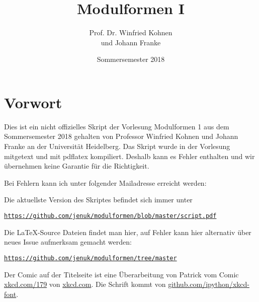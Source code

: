 \documentclass[parskip=half]{scrbook}
\title{Modulformen I}
\author{Prof. Dr. Winfried Kohnen \\[0.2\baselineskip] und Johann Franke}
\date{Sommersemester 2018}
\begin{document}
\pagestyle{plain}

\maketitle

\chapter*{Vorwort}

Dies ist ein nicht offizielles Skript der Vorlesung Modulformen 1 aus dem Sommersemester 2018 gehalten von Professor Winfried Kohnen und Johann Franke an der Universität Heidelberg.
Das Skript wurde in der Vorlesung mitgetext und mit pdflatex kompiliert.
Deshalb kann es Fehler enthalten und wir übernehmen keine Garantie für die Richtigkeit.

Bei Fehlern kann ich unter folgender Mailadresse erreicht werden:

\begin{center}
\end{center}

Die aktuellste Version des Skriptes befindet sich immer unter
\begin{center}
\texttt{\url{https://github.com/jenuk/modulformen/blob/master/script.pdf}}
\end{center}

Die \LaTeX-Source Dateien findet man hier, auf Fehler kann hier alternativ über neues Issue aufmerksam gemacht werden:
\begin{center}
\texttt{\url{https://github.com/jenuk/modulformen/tree/master}}
\end{center}

Der Comic auf der Titelseite ist eine Überarbeitung von Patrick vom Comic \url{xkcd.com/179} von \url{xkcd.com}. 
Die Schrift kommt von \url{github.com/ipython/xkcd-font}.

\clearpage
{}
{}
\tableofcontents

\clearpage
{}
\setcounter{page}{0}
\pagestyle{fancy}














\appendix


\printindex

\end{document}
